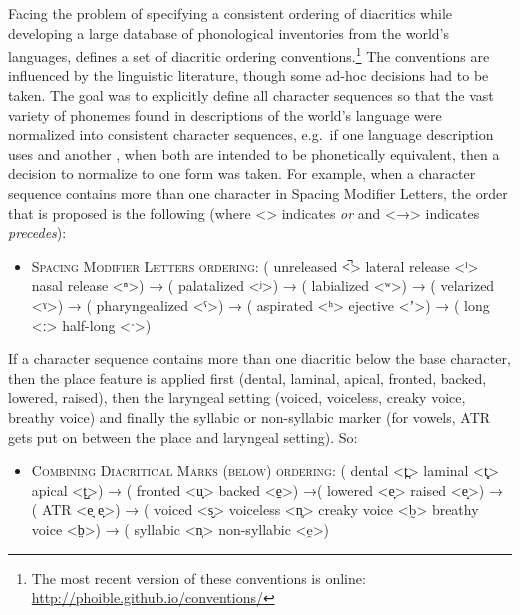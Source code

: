 Facing the problem of specifying a consistent ordering of diacritics while
developing a large database of phonological inventories from the world's
languages, \citet[540]{Moran2012} defines a set of diacritic ordering
conventions.\footnote{The most recent version of these conventions is online:
\url{http://phoible.github.io/conventions/}} The conventions are influenced by
the linguistic literature, though some ad-hoc decisions had to be taken. The
goal was to explicitly define all character sequences so that the vast variety
of phonemes found in descriptions of the world's language were normalized into
consistent character sequences, e.g.~if one language description uses and
another , when both are intended to be phonetically equivalent, then a decision
to normalize to one form was taken. For example, when a character sequence
contains more than one character in Spacing Modifier Letters, the order that is
proposed is the following (where <\textbar{}> indicates \textit{or} and <→>
indicates \textit{precedes}):

\begin{itemize}
	\itemsep1pt\parskip0pt 
	\item \textsc{Spacing Modifier Letters ordering:} ( unreleased <̚> \textbar{} lateral release <ˡ> \textbar{} nasal release <ⁿ>) → ( palatalized <ʲ>) → ( labialized <ʷ>) → ( velarized <ˠ>) → ( pharyngealized <ˤ>) → ( aspirated <ʰ> \textbar{} ejective <ʼ>) → ( long <ː> \textbar{} half-long <ˑ>) 
\end{itemize}

If a character sequence contains more than one diacritic below the base
character, then the place feature is applied first (dental, laminal, apical,
fronted, backed, lowered, raised), then the laryngeal setting (voiced,
voiceless, creaky voice, breathy voice) and finally the syllabic or non-syllabic
marker (for vowels, ATR gets put on between the place and laryngeal setting).
So:

\begin{itemize}
	\itemsep1pt\parskip0pt 
	\item \textsc{Combining Diacritical Marks (below) ordering:} ( dental <t̪> \textbar{} laminal <t̻> \textbar{} apical <t̺>) → ( fronted <u̟> \textbar{} backed <e̠>) →( lowered <e̞> \textbar{} raised <e̝>) → ( ATR <e̘ e̙>) → ( voiced <s̬> \textbar{} voiceless <n̥> \textbar{} creaky voice <b̰> \textbar{} breathy voice <b̤>) → ( syllabic <n̩> \textbar{} non-syllabic <e̯>) 
\end{itemize}

